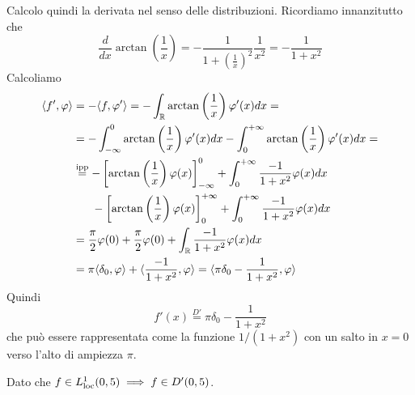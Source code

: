 Calcolo quindi la derivata nel senso delle distribuzioni. Ricordiamo innanzitutto che
\begin{equation*}
\frac{d}{dx}\arctan\left(\frac{1}{x}\right) = - \frac{1}{1 + \left(\frac{1}{x}\right)^{2}}\frac{1}{x^{2}} = - \frac{1}{1 + x^{2}}
\end{equation*}
Calcoliamo
\begin{align*}
\langle f', \varphi \rangle  & = - \langle f, \varphi '\rangle = - \int_{\mathbb{R}}\arctan\left(\frac{1}{x}\right) \varphi '(x)dx = \\
 & = - \int^{0}_{- \infty}\arctan\left(\frac{1}{x}\right) \varphi '(x)dx - \int^{+ \infty}_{0}\arctan\left(\frac{1}{x}\right) \varphi '(x)dx = \\
 & \overset{\text{ipp}}{=} - \left[\arctan\left(\frac{1}{x}\right) \varphi (x)\right]^{0}_{- \infty} + \int^{+ \infty}_{0}\frac{- 1}{1 + x^{2}} \varphi (x) dx\\
 & \ \ \ \ \ - \left[\arctan\left(\frac{1}{x}\right) \varphi (x)\right]^{+ \infty}_{0} + \int^{+ \infty}_{0}\frac{- 1}{1 + x^{2}} \varphi (x) dx\\
 & = \frac{\pi}{2} \varphi (0) + \frac{\pi}{2} \varphi (0) + \int_{\mathbb{R}}\frac{- 1}{1 + x^{2}} \varphi (x)dx\\
 & = \pi \langle \delta_{0}, \varphi \rangle + \langle \frac{- 1}{1 + x^{2}}, \varphi \rangle = \langle \pi \delta_{0} - \frac{1}{1 + x^{2}}, \varphi \rangle 
\end{align*}
Quindi
\begin{equation*}
f'(x)\overset{D'}{=} \pi \delta_{0} - \frac{1}{1 + x^{2}}
\end{equation*}
che può essere rappresentata come la funzione $1/\left(1 + x^{2}\right)$ con un salto in $x = 0$ verso l'alto di ampiezza $\pi $.
\Soluzione

Dato che $f\in L^{1}_{\operatorname{loc}} (0, 5)\implies f\in D'(0, 5)$.


